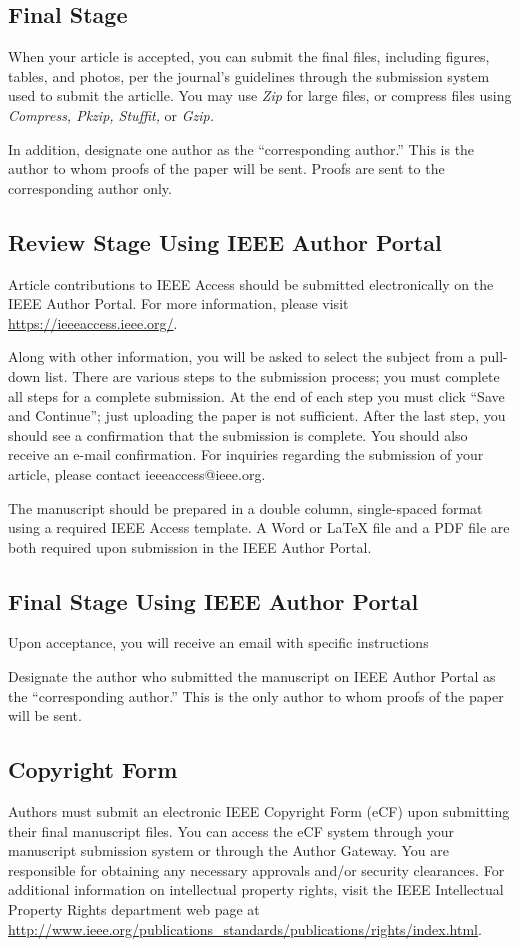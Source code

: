 \documentclass{ieeeaccess}
\begin{document}
\subsection{Final Stage}
When your article is accepted, you can submit the final files, including figures, tables, and photos, per the journal's guidelines through the submission system used to submit the articlle.
 You may use \emph{Zip} for large files, or compress files using \emph{Compress, Pkzip, Stuffit,} or \emph{Gzip.}

In addition, designate one author as the ``corresponding author.'' This is the author to
whom proofs of the paper will be sent. Proofs are sent to the corresponding
author only.

\subsection{Review Stage Using IEEE Author Portal}
Article contributions to IEEE Access should be submitted electronically on the IEEE Author Portal. For more information, please visit
\underline{https://ieeeaccess.ieee.org/}.

Along with other information, you will be asked to select the subject from a
pull-down list. There are various steps to the
submission process; you must complete all steps for a complete submission.
At the end of each step you must click ``Save and Continue''; just uploading
the paper is not sufficient. After the last step, you should see a
confirmation that the submission is complete. You should also receive an
e-mail confirmation. For inquiries regarding the submission of your article, please contact ieeeaccess@ieee.org.

The manuscript should be prepared in a double column, single-spaced format using a required IEEE Access template.
A Word or LaTeX file and a PDF file are both required upon submission in the IEEE Author Portal.

\subsection{Final Stage Using IEEE Author Portal}
Upon acceptance, you will receive an email with specific instructions

Designate the author who submitted the manuscript on
IEEE Author Portal as the ``corresponding author.'' This is the only
author to whom proofs of the paper will be sent.

\subsection{Copyright Form}
Authors must submit an electronic IEEE Copyright Form (eCF) upon submitting
their final manuscript files. You can access the eCF system through your
manuscript submission system or through the Author Gateway. You are
responsible for obtaining any necessary approvals and/or security
clearances. For additional information on intellectual property rights,
visit the IEEE Intellectual Property Rights department web page at
\underline{http://www.ieee.org/publications\_standards/publications/}\break\underline{rights/index.html}.
\end{document}
